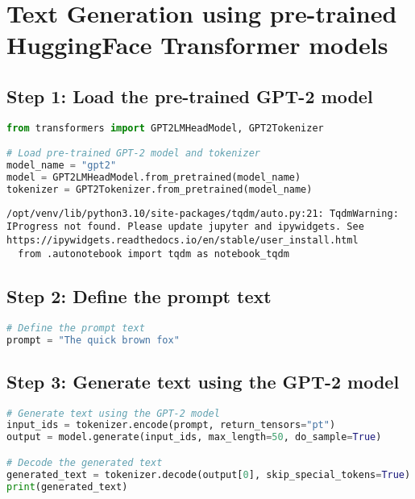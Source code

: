 \section{Text Generation using pre-trained HuggingFace Transformer
models}\label{text-generation-using-pre-trained-huggingface-transformer-models}

\subsection{Step 1: Load the pre-trained GPT-2
model}\label{step-1-load-the-pre-trained-gpt-2-model}

\begin{lstlisting}[language=Python]
from transformers import GPT2LMHeadModel, GPT2Tokenizer

# Load pre-trained GPT-2 model and tokenizer
model_name = "gpt2"
model = GPT2LMHeadModel.from_pretrained(model_name)
tokenizer = GPT2Tokenizer.from_pretrained(model_name)
\end{lstlisting}

\begin{lstlisting}
/opt/venv/lib/python3.10/site-packages/tqdm/auto.py:21: TqdmWarning: IProgress not found. Please update jupyter and ipywidgets. See https://ipywidgets.readthedocs.io/en/stable/user_install.html
  from .autonotebook import tqdm as notebook_tqdm
\end{lstlisting}

\subsection{Step 2: Define the prompt
text}\label{step-2-define-the-prompt-text}

\begin{lstlisting}[language=Python]
# Define the prompt text
prompt = "The quick brown fox"
\end{lstlisting}

\subsection{Step 3: Generate text using the GPT-2
model}\label{step-3-generate-text-using-the-gpt-2-model}

\begin{lstlisting}[language=Python]
# Generate text using the GPT-2 model
input_ids = tokenizer.encode(prompt, return_tensors="pt")
output = model.generate(input_ids, max_length=50, do_sample=True)

# Decode the generated text
generated_text = tokenizer.decode(output[0], skip_special_tokens=True)
print(generated_text)
\end{lstlisting}


